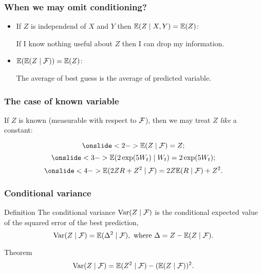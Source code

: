 \begin{frame}
    \frametitle{When we may omit conditioning?}

    \begin{itemize}[<+->]

        \item If $Z$ is \alert{independend} of $X$ and $Y$ then $\mathbb{E}(Z \mid X, Y) = \mathbb{E}(Z)$:

        If I know \alert{nothing useful} about $Z$ then I can drop my information. 

        \item $\mathbb{E}( \mathbb{E}( Z \mid \mathcal{F}) ) = \mathbb{E}(Z)$:
        
        The \alert{average of best guess} is the average of predicted variable. 

    \end{itemize}

\end{frame}




\begin{frame}
    \frametitle{The case of known variable}

    If $Z$ is \alert{known} (measurable with respect to $\mathcal{F}$), 
    then we may treat $Z$ \textit{like} a constant:

    \[
        \onslide<2->{\E(Z \mid \cF ) = Z;}
    \]
    \[
        \onslide<3->{\E(2\exp(5W_t) \mid W_t) = 2\exp(5W_t);}
    \]
    \[
        \onslide<4->{\E(2Z R + Z^2 \mid \cF ) = 2Z \E(R\mid \cF) + Z^2.}
    \]


\end{frame}


\begin{frame}
    \frametitle{Conditional variance}

    \begin{block}{Definition \formalduck}
        The \alert{conditional variance} $\operatorname{Var}(Z \mid \mathcal{F})$ is the conditional expected value of the 
        squared error of the best prediction,
        \pause
        \[
            \operatorname{Var}(Z \mid \mathcal{F}) = \mathbb{E}(\Delta^2 \mid \mathcal{F}), \text{ where } \Delta = Z - \mathbb{E}(Z \mid \mathcal{F}).
        \]
    \end{block}

    \pause 
    \begin{block}{Theorem \formalduck}
        \[
            \operatorname{Var}(Z \mid \mathcal{F}) = \mathbb{E}(Z^2 \mid \mathcal{F}) - (\mathbb{E}(Z \mid \mathcal{F}) )^2.
        \]
    \end{block}
\end{frame}




